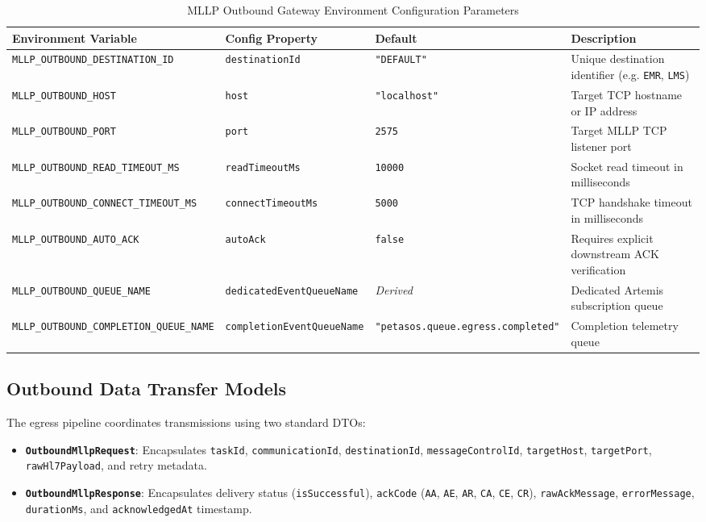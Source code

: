 \begin{table}[htbp]
\centering
\small
\begin{tabularx}{\textwidth}{l p{4.0cm} l p{4.0cm}}
\toprule
\textbf{Environment Variable} & \textbf{Config Property} & \textbf{Default} & \textbf{Description} \\
\midrule
\texttt{MLLP\_OUTBOUND\_DESTINATION\_ID} & \texttt{destinationId} & \texttt{"DEFAULT"} & Unique destination identifier (e.g. \texttt{EMR}, \texttt{LMS}) \\
\texttt{MLLP\_OUTBOUND\_HOST} & \texttt{host} & \texttt{"localhost"} & Target TCP hostname or IP address \\
\texttt{MLLP\_OUTBOUND\_PORT} & \texttt{port} & \texttt{2575} & Target MLLP TCP listener port \\
\texttt{MLLP\_OUTBOUND\_READ\_TIMEOUT\_MS} & \texttt{readTimeoutMs} & \texttt{10000} & Socket read timeout in milliseconds \\
\texttt{MLLP\_OUTBOUND\_CONNECT\_TIMEOUT\_MS} & \texttt{connectTimeoutMs} & \texttt{5000} & TCP handshake timeout in milliseconds \\
\texttt{MLLP\_OUTBOUND\_AUTO\_ACK} & \texttt{autoAck} & \texttt{false} & Requires explicit downstream ACK verification \\
\texttt{MLLP\_OUTBOUND\_QUEUE\_NAME} & \texttt{dedicatedEventQueueName} & \textit{Derived} & Dedicated Artemis subscription queue \\
\texttt{MLLP\_OUTBOUND\_COMPLETION\_QUEUE\_NAME} & \texttt{completionEventQueueName} & \texttt{"petasos.queue.egress.completed"} & Completion telemetry queue \\
\bottomrule
\end{tabularx}
\caption{MLLP Outbound Gateway Environment Configuration Parameters}
\label{tab:outbound_config_params}
\end{table}

\subsection{Outbound Data Transfer Models}

The egress pipeline coordinates transmissions using two standard DTOs:
\begin{itemize}
    \item \textbf{\texttt{OutboundMllpRequest}}: Encapsulates \texttt{taskId}, \texttt{communicationId}, \texttt{destinationId}, \texttt{messageControlId}, \texttt{targetHost}, \texttt{targetPort}, \texttt{rawHl7Payload}, and retry metadata.
    \item \textbf{\texttt{OutboundMllpResponse}}: Encapsulates delivery status (\texttt{isSuccessful}), \texttt{ackCode} (\texttt{AA}, \texttt{AE}, \texttt{AR}, \texttt{CA}, \texttt{CE}, \texttt{CR}), \texttt{rawAckMessage}, \texttt{errorMessage}, \texttt{durationMs}, and \texttt{acknowledgedAt} timestamp.
\end{itemize}

